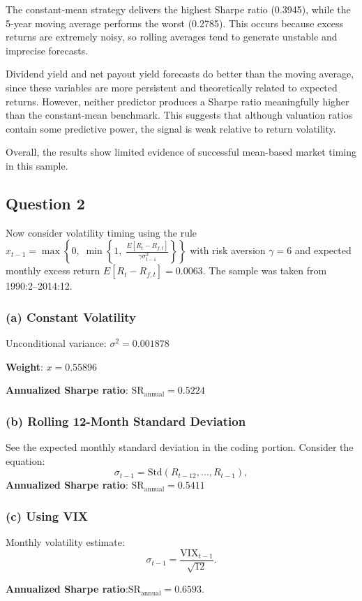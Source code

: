 The constant‐mean strategy delivers the highest Sharpe ratio (0.3945), while the 5-year moving average performs the worst (0.2785). This occurs because excess returns are extremely noisy, so rolling averages tend to generate unstable and imprecise forecasts.

Dividend yield and net payout yield forecasts do better than the moving average, since these variables are more persistent and theoretically related to expected returns. However, neither predictor produces a Sharpe ratio meaningfully higher than the constant‐mean benchmark. This suggests that although valuation ratios contain some predictive power, the signal is weak relative to return volatility.

Overall, the results show limited evidence of successful mean-based market timing in this sample.
\subsection*{Question 2}
Now consider volatility timing using the rule
$x_{t-1} = 
\max\left\{0,\; 
\min\left\{1,\; 
\frac{E[R_t - R_{f,t}]}{\gamma\sigma_{t-1}^2}
\right\}\right\}
$
with risk aversion $\gamma = 6$ and expected monthly excess return
$
E[R_t - R_{f,t}] = 0.0063.
$ The sample was taken from 1990:2–2014:12.
\subsubsection*{(a) Constant Volatility}
Unconditional variance: $\sigma^2 = 0.001878$

\textbf{Weight}: $x = 0.55896$

\textbf{Annualized Sharpe ratio}: $\boxed{\text{SR}_{\text{annual}} = 0.5224}$

\subsubsection*{(b) Rolling 12-Month Standard Deviation}
See the expected monthly standard deviation in the coding portion.
Consider the equation:
\[
\sigma_{t-1} = \text{Std}(R_{t-12},\ldots,R_{t-1}),
\]
\textbf{Annualized Sharpe ratio}: $\boxed{\text{SR}_{\text{annual}} = 0.5411}$
\subsubsection*{(c) Using VIX}
Monthly volatility estimate:
\[
\sigma_{t-1} = \frac{\text{VIX}_{t-1}}{\sqrt{12}}.
\]

\textbf{Annualized Sharpe ratio}:$\boxed{\text{SR}_{\text{annual}} = 0.6593.}$

